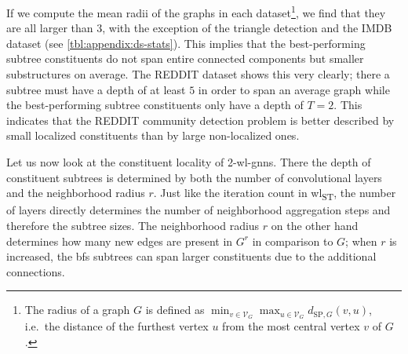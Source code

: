 If we compute the mean radii of the graphs in each dataset\footnote{
	The radius of a graph $G$ is defined as $\min_{v \in \mathcal{V}_G} \max_{u \in \mathcal{V}_G} d_{\mathrm{SP}, G}(v, u)$, i.e.\ the distance of the furthest vertex $u$ from the most central vertex $v$ of $G$.
}, we find that they are all larger than $3$, with the exception of the triangle detection and the IMDB dataset (see \cref{tbl:appendix:ds-stats}).
This implies that the best-performing subtree constituents do not span entire connected components but smaller substructures on average.
The REDDIT dataset shows this very clearly; there a subtree must have a depth of at least $5$ in order to span an average graph while the best-performing subtree constituents only have a depth of $T = 2$.
This indicates that the REDDIT community detection problem is better described by small localized constituents than by large non-localized ones.

Let us now look at the constituent locality of 2-\acs{wl}-\acsp{gnn}.
There the depth of constituent subtrees is determined by both the number of convolutional layers and the neighborhood radius $r$.
Just like the iteration count in \acs{wl}\textsubscript{ST}, the number of layers directly determines the number of neighborhood aggregation steps and therefore the subtree sizes.
The neighborhood radius $r$ on the other hand determines how many new edges are present in $G^r$ in comparison to $G$;
when $r$ is increased, the \ac{bfs} subtrees can span larger constituents due to the additional connections.

